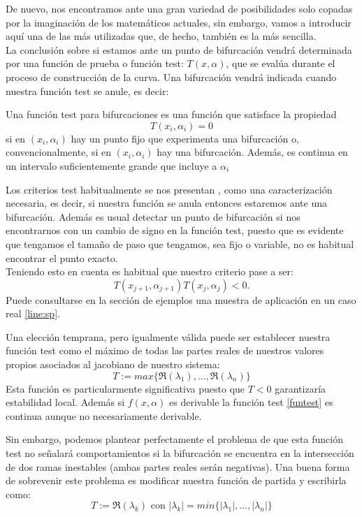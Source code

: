 De nuevo, nos encontramos ante una gran variedad de posibilidades \cite{Kuznet,prac,Lectures} solo copadas por la imaginación de los matemáticos actuales, sin embargo, vamos a introducir aquí una de las más utilizadas que, de hecho, también es la más sencilla.\\
La conclusión sobre si estamos ante un punto de bifurcación vendrá determinada por una función de prueba o función test: $T(x, \alpha)$, que se evalúa durante el proceso de construcción de la curva. Una bifurcación vendrá indicada cuando nuestra función test se anule, es decir:
\begin{defi}
	Una función test para bifurcaciones es una función que satisface la propiedad
	\[T(x_i,\alpha_i)=0\]
	si en $(x_i,\alpha_i)$ hay un punto fijo que experimenta una bifurcación o, convencionalmente, si en $(x_i,\alpha_i)$ hay una bifurcación. Además, es continua en un intervalo suficientemente grande que incluye a $\alpha_i$
	\label{funtest}
\end{defi} 
Los criterios test habitualmente se nos presentan \cite{Lectures,prac}, como una caracterización necesaria, es decir, si nuestra función se anula entonces estaremos ante una bifurcación. Además es usual detectar un punto de bifurcación si nos encontrarnos con un cambio de signo en la función test, puesto que es evidente que tengamos el tamaño de paso que tengamos, sea fijo o variable, no es habitual encontrar el punto exacto.\\ Teniendo esto en cuenta es habitual que nuestro criterio pase a ser:
\begin{equation}
T(x_{j+1}, \alpha_{j+1}) T (x_j, \alpha_j) <0.
\label{crite}
\end{equation}
Puede consultarse en la sección de ejemplos una muestra de aplicación en un caso real \ref{line:sp}.

Una elección temprana, pero igualmente válida puede ser establecer nuestra función test como el máximo de todas las partes reales de nuestros valores propios asociados al jacobiano de nuestro sistema:
\begin{equation}
T:=max\{\Re(\lambda_1),...,\Re(\lambda_n)\}
\label{ftest1}
\end{equation}
Esta función es particularmente significativa puesto que $T<0$ garantizaría estabilidad local. Además si $f(x,\alpha)$ es derivable la función test \ref{funtest} es continua aunque no necesariamente derivable.

Sin embargo, podemos plantear perfectamente el problema de que esta función test no señalará comportamientos si la bifurcación se encuentra en la intersección de dos ramas inestables (ambas partes reales serán negativas). Una buena forma de sobrevenir este problema es modificar nuestra función de partida \cite{funci} y escribirla como:
\begin{equation}
T:=\Re(\lambda_k) \text{ con } |\lambda_k|=min\{|\lambda_1|,...,|\lambda_n|\}
\end{equation}

